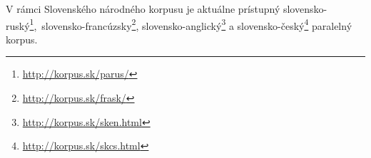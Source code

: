 \noindent V rámci Slovenského národného korpusu je aktuálne
prístupný
slovensko-ruský\footnote{\url{http://korpus.sk/parus/}}, slovensko-francúzsky\footnote{\url{http://korpus.sk/frask/}},
slovensko-anglický\footnote{\url{http://korpus.sk/sken.html}} a
slovensko-český\footnote{\url{http://korpus.sk/skcs.html}} paralelný
korpus. 
